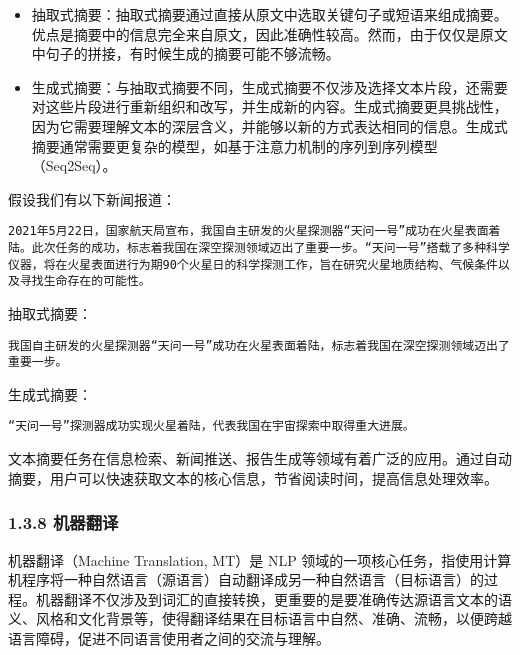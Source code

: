 \documentclass[12pt,a4paper]{book}
\begin{document}
\begin{itemize}
\tightlist
\item
  抽取式摘要：抽取式摘要通过直接从原文中选取关键句子或短语来组成摘要。优点是摘要中的信息完全来自原文，因此准确性较高。然而，由于仅仅是原文中句子的拼接，有时候生成的摘要可能不够流畅。
\item
  生成式摘要：与抽取式摘要不同，生成式摘要不仅涉及选择文本片段，还需要对这些片段进行重新组织和改写，并生成新的内容。生成式摘要更具挑战性，因为它需要理解文本的深层含义，并能够以新的方式表达相同的信息。生成式摘要通常需要更复杂的模型，如基于注意力机制的序列到序列模型（Seq2Seq）。
\end{itemize}

假设我们有以下新闻报道：

\begin{verbatim}
2021年5月22日，国家航天局宣布，我国自主研发的火星探测器“天问一号”成功在火星表面着陆。此次任务的成功，标志着我国在深空探测领域迈出了重要一步。“天问一号”搭载了多种科学仪器，将在火星表面进行为期90个火星日的科学探测工作，旨在研究火星地质结构、气候条件以及寻找生命存在的可能性。
\end{verbatim}

抽取式摘要：

\begin{verbatim}
我国自主研发的火星探测器“天问一号”成功在火星表面着陆，标志着我国在深空探测领域迈出了重要一步。
\end{verbatim}

生成式摘要：

\begin{verbatim}
“天问一号”探测器成功实现火星着陆，代表我国在宇宙探索中取得重大进展。
\end{verbatim}

文本摘要任务在信息检索、新闻推送、报告生成等领域有着广泛的应用。通过自动摘要，用户可以快速获取文本的核心信息，节省阅读时间，提高信息处理效率。

\subsubsection{1.3.8 机器翻译}\label{ux673aux5668ux7ffbux8bd1}

机器翻译（Machine Translation, MT）是 NLP
领域的一项核心任务，指使用计算机程序将一种自然语言（源语言）自动翻译成另一种自然语言（目标语言）的过程。机器翻译不仅涉及到词汇的直接转换，更重要的是要准确传达源语言文本的语义、风格和文化背景等，使得翻译结果在目标语言中自然、准确、流畅，以便跨越语言障碍，促进不同语言使用者之间的交流与理解。
\end{document}
